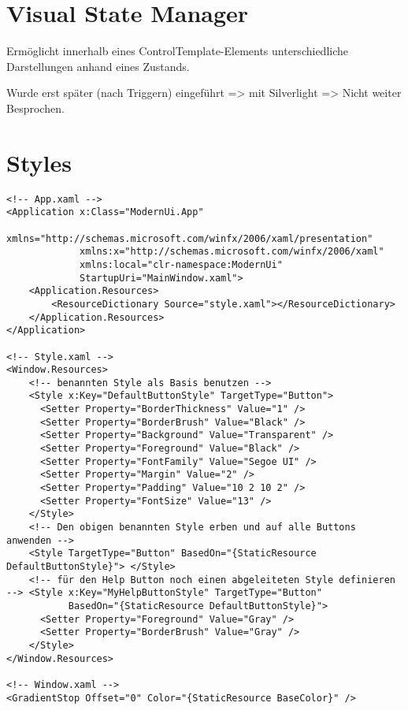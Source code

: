 \section{Visual State Manager}

Ermöglicht innerhalb eines ControlTemplate-Elements unterschiedliche Darstellungen anhand eines Zustands.

Wurde erst später (nach Triggern) eingeführt => mit Silverlight => Nicht weiter Besprochen.

\section{Styles}

\begin{lstlisting}
<!-- App.xaml -->
<Application x:Class="ModernUi.App"
             xmlns="http://schemas.microsoft.com/winfx/2006/xaml/presentation"
             xmlns:x="http://schemas.microsoft.com/winfx/2006/xaml"
             xmlns:local="clr-namespace:ModernUi"
             StartupUri="MainWindow.xaml">
    <Application.Resources>
        <ResourceDictionary Source="style.xaml"></ResourceDictionary>
    </Application.Resources>
</Application>

<!-- Style.xaml -->
<Window.Resources>
    <!-- benannten Style als Basis benutzen -->
    <Style x:Key="DefaultButtonStyle" TargetType="Button">
      <Setter Property="BorderThickness" Value="1" />
      <Setter Property="BorderBrush" Value="Black" />
      <Setter Property="Background" Value="Transparent" />
      <Setter Property="Foreground" Value="Black" />
      <Setter Property="FontFamily" Value="Segoe UI" />
      <Setter Property="Margin" Value="2" />
      <Setter Property="Padding" Value="10 2 10 2" />
      <Setter Property="FontSize" Value="13" />
    </Style>
    <!-- Den obigen benannten Style erben und auf alle Buttons anwenden -->
    <Style TargetType="Button" BasedOn="{StaticResource DefaultButtonStyle}"> </Style>
    <!-- für den Help Button noch einen abgeleiteten Style definieren --> <Style x:Key="MyHelpButtonStyle" TargetType="Button"
           BasedOn="{StaticResource DefaultButtonStyle}">
      <Setter Property="Foreground" Value="Gray" />
      <Setter Property="BorderBrush" Value="Gray" />
    </Style>
</Window.Resources>

<!-- Window.xaml -->
<GradientStop Offset="0" Color="{StaticResource BaseColor}" />
\end{lstlisting}

